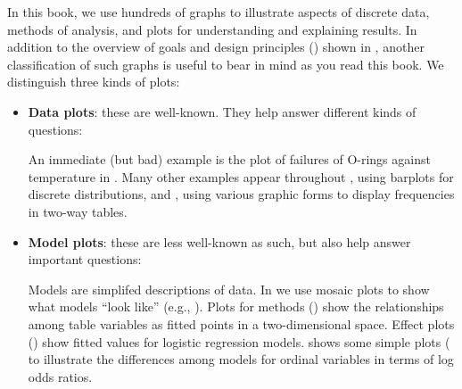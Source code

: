 
In this book, we use hundreds of graphs to illustrate aspects of discrete data,
methods of analysis, and plots for understanding and explaining results.
In addition to the overview of goals and design principles ()
shown in , another classification of such graphs is
useful to bear in mind as you read this book.  We distinguish three kinds of plots:

\begin{itemize}
    \item \textbf{Data plots}: these are well-known. They help answer different kinds of questions:

    An immediate (but bad) example is the plot of failures of O-rings against temperature
    in . Many other examples appear throughout ,
    using barplots for discrete distributions, and , using various graphic forms
    to display frequencies in two-way tables.

    \item \textbf{Model plots}: these are less well-known as such, but also help answer important questions:

    Models are simplifed descriptions of data.  In  we use mosaic
    plots to show what \loglin models ``look like'' (e.g., ).
    Plots for \ca methods () show the relationships among table variables
    as fitted points in a two-dimensional space.
    Effect plots () show fitted values for logistic regression models.
     shows some simple plots (
    to illustrate the differences among models for ordinal variables in terms of log odds ratios.


\end{itemize}
